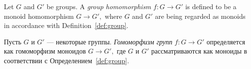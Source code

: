 \documentclass[../main/CT4S-EN-RU]{subfiles}
\begin{document}
\begin{definitionENG}\label{def:group homomorphism}
Let $G$ and $G'$ be groups. A {\em group homomorphism} $f\colon G{→} G'$ is defined to be a monoid homomorphism $G{→} G',$ where $G$ and $G'$ are being regarded as monoids in accordance with Definition~\ref{def:group}.
\end{definitionENG}

\begin{definitionRUS}\label{def:group homomorphism}
Пусть $G$ и $G'$ — некоторые группы. {\em Гомоморфизм групп} $f\colon G{→} G'$ определяется как гомоморфизм моноидов $G{→} G',$ где $G$ и $G'$ рассматриваются как моноиды в соответствии с Определением~\ref{def:group}.
\end{definitionRUS}
\end{document}
